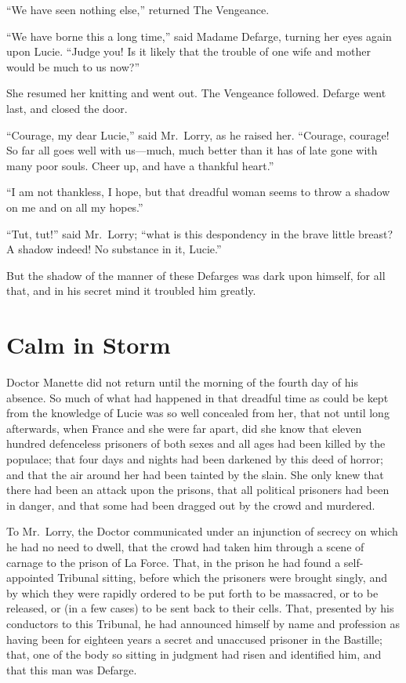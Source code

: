 ``We have seen nothing else,'' returned The Vengeance.

``We have borne this a long time,'' said Madame Defarge, turning her
eyes again upon Lucie.  ``Judge you!  Is it likely that the trouble of
one wife and mother would be much to us now?''

She resumed her knitting and went out.  The Vengeance followed.
Defarge went last, and closed the door.

``Courage, my dear Lucie,'' said Mr.\ Lorry, as he raised her.
``Courage, courage!  So far all goes well with us---much, much better
than it has of late gone with many poor souls.  Cheer up, and have a
thankful heart.''

``I am not thankless, I hope, but that dreadful woman seems to throw a
shadow on me and on all my hopes.''

``Tut, tut!'' said Mr.\ Lorry; ``what is this despondency in the brave
little breast?  A shadow indeed!  No substance in it, Lucie.''

But the shadow of the manner of these Defarges was dark upon himself,
for all that, and in his secret mind it troubled him greatly.



\chapter{Calm in Storm}


Doctor Manette did not return until the morning of the fourth day of
his absence.  So much of what had happened in that dreadful time as
could be kept from the knowledge of Lucie was so well concealed from
her, that not until long afterwards, when France and she were far apart,
did she know that eleven hundred defenceless prisoners of both sexes
and all ages had been killed by the populace; that four days and
nights had been darkened by this deed of horror; and that the air
around her had been tainted by the slain.  She only knew that there
had been an attack upon the prisons, that all political prisoners had
been in danger, and that some had been dragged out by the crowd and
murdered.

To Mr.\ Lorry, the Doctor communicated under an injunction of secrecy
on which he had no need to dwell, that the crowd had taken him
through a scene of carnage to the prison of La Force.  That, in the
prison he had found a self-appointed Tribunal sitting, before which
the prisoners were brought singly, and by which they were rapidly
ordered to be put forth to be massacred, or to be released, or (in a
few cases) to be sent back to their cells.  That, presented by his
conductors to this Tribunal, he had announced himself by name and
profession as having been for eighteen years a secret and unaccused
prisoner in the Bastille; that, one of the body so sitting in
judgment had risen and identified him, and that this man was Defarge.

